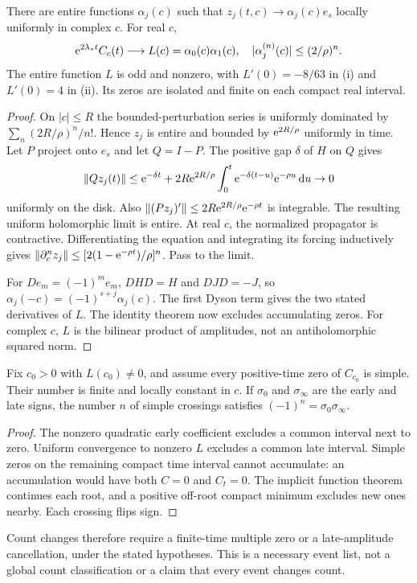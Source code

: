 \documentclass[11pt]{article}
\begin{document}
\begin{theorem}\label{thm:late}
There are entire functions $\alpha_j(c)$ such that
$z_j(t,c)\to\alpha_j(c)e_s$ locally uniformly in complex $c$. For real $c$,
\[
 \mathrm e^{2\lambda_*t}C_c(t)\longrightarrow
 L(c)=\alpha_0(c)\alpha_1(c),\quad
 |\alpha_j^{(n)}(c)|\leq(2/\rho)^n .
\]
The entire function $L$ is odd and nonzero, with
$L'(0)=-8/63$ in (i) and $L'(0)=4$ in (ii).
Its zeros are isolated and finite on each compact real interval.
\end{theorem}
\begin{proof}
On $|c|\leq R$ the bounded-perturbation series is uniformly dominated by
$\sum_n(2R/\rho)^n/n!$. Hence $z_j$ is entire and bounded by
$\mathrm e^{2R/\rho}$ uniformly in time.
Let $P$ project onto $e_s$ and let $Q=I-P$. The positive gap $\delta$
of $H$ on $Q$ gives
\[
 \left\lVert Qz_j(t)\right\rVert
 \leq \mathrm e^{-\delta t}
 +2R\mathrm e^{2R/\rho}\int_0^t\mathrm e^{-\delta(t-u)}\mathrm e^{-\rho u}\,\mathrm d u\to0
\]
uniformly on the disk. Also
$\left\lVert (Pz_j)'\right\rVert\leq2R\mathrm e^{2R/\rho}\mathrm e^{-\rho t}$ is integrable.
The resulting uniform holomorphic limit is entire. At real $c$, the
normalized propagator is contractive. Differentiating the equation and
integrating its forcing inductively gives
$\left\lVert \partial_c^n z_j\right\rVert\leq[2(1-\mathrm e^{-\rho t})/\rho]^n$.
Pass to the limit.

For $De_m=(-1)^me_m$, $DHD=H$ and $DJD=-J$, so
$\alpha_j(-c)=(-1)^{s+j}\alpha_j(c)$.
The first Dyson term gives the two stated derivatives of $L$.
The identity theorem now excludes accumulating zeros.
For complex $c$, $L$ is the bilinear product of amplitudes, not an
antiholomorphic squared norm.
\end{proof}

\begin{proposition}\label{prop:count}
Fix $c_0>0$ with $L(c_0)\ne0$, and assume every positive-time zero
of $C_{c_0}$ is simple. Their number is finite and locally constant in $c$.
If $\sigma_0$ and $\sigma_\infty$ are the early and late signs, the number
$n$ of simple crossings satisfies $(-1)^n=\sigma_0\sigma_\infty$.
\end{proposition}
\begin{proof}
The nonzero quadratic early coefficient excludes a common interval next
to zero. Uniform convergence to nonzero $L$ excludes a common late interval.
Simple zeros on the remaining compact time interval cannot accumulate:
an accumulation would have both $C=0$ and $C_t=0$.
The implicit function theorem continues each root, and a positive
off-root compact minimum excludes new ones nearby. Each crossing flips sign.
\end{proof}
Count changes therefore require a finite-time multiple zero or a late-amplitude
cancellation, under the stated hypotheses. This is a necessary event list,
not a global count classification or a claim that every event changes count.
\end{document}
